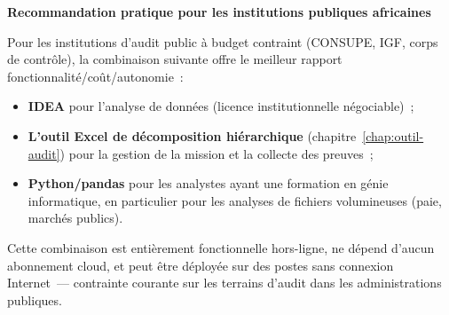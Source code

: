 \begin{boxalert}
\textbf{Recommandation pratique pour les institutions publiques africaines}

Pour les institutions d'audit public à budget contraint (CONSUPE, IGF,
corps de contrôle), la combinaison suivante offre le meilleur rapport
fonctionnalité/coût/autonomie~:

\begin{itemize}
  \item \textbf{IDEA} pour l'analyse de données (licence institutionnelle
        négociable)~;
  \item \textbf{L'outil Excel de décomposition hiérarchique}
        (chapitre~\ref{chap:outil-audit}) pour la gestion de la mission
        et la collecte des preuves~;
  \item \textbf{Python/pandas} pour les analystes ayant une formation
        en génie informatique, en particulier pour les analyses de fichiers
        volumineuses (paie, marchés publics).
\end{itemize}

Cette combinaison est entièrement fonctionnelle hors-ligne, ne dépend
d'aucun abonnement cloud, et peut être déployée sur des postes sans
connexion Internet~--- contrainte courante sur les terrains d'audit dans
les administrations publiques.
\end{boxalert}